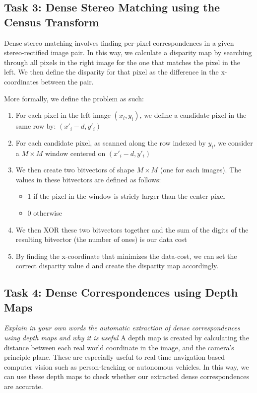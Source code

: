 \documentclass{article}
\begin{document}
\subsection{Task 3: Dense Stereo Matching using the Census Transform}
Dense stereo matching involves finding per-pixel correspondences in a given stereo-rectified image pair. In this way, we calculate
a disparity map by searching through all pixels in the right image for the one that matches the pixel in the left. We then define the disparity
for that pixel as the difference in the x-coordinates between the pair.

More formally, we define the problem as such:
\begin{enumerate}
    \item For each pixel in the left image $\left(x_i, y_i\right)$, we define a candidate pixel in the same row by: $\left(x'_i - d, y'_i\right)$
    \item For each candidate pixel, as scanned along the row indexed by $y_i$, we consider a $M\times M$ window centered on $\left(x'_i - d, y'_i\right)$
    \item We then create two bitvectors of shape $M\times M$ (one for each images). The values in these bitvectors are defined as follows:
        \begin{itemize}
            \item 1 if the pixel in the window is stricly larger than the center pixel
            \item 0 otherwise
        \end{itemize}
    \item We then XOR these two bitvectors together and the sum of the digits of the resulting bitvector (the number of ones) is our data cost
    \item By finding the x-coordinate that minimizes the data-cost, we can set the correct disparity value d and create the disparity map accordingly.
\end{enumerate}


\subsection{Task 4: Dense Correspondences using Depth Maps}
\textit{Explain in your own words the automatic extraction of dense correspondences using depth
maps and why it is useful}
A depth map is created by calculating the distance between each real world coordinate in the image, and the camera's principle plane. These are especially useful to
real time navigation based computer vision such as person-tracking or autonomous vehicles. In this way, we can use these depth maps to check whether our extracted 
dense correspondences are accurate.
\end{document}
